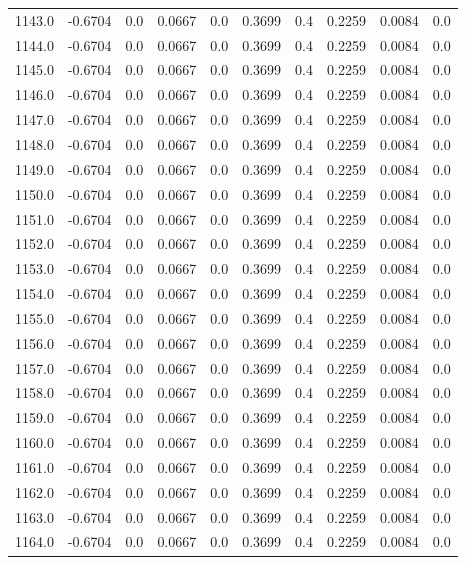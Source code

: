 \begin{longtable}{lrrrrrrrrr}
1143.0 & -0.6704 & 0.0 & 0.0667 & 0.0 & 0.3699 & 0.4 & 0.2259 & 0.0084 & 0.0 \\
1144.0 & -0.6704 & 0.0 & 0.0667 & 0.0 & 0.3699 & 0.4 & 0.2259 & 0.0084 & 0.0 \\
1145.0 & -0.6704 & 0.0 & 0.0667 & 0.0 & 0.3699 & 0.4 & 0.2259 & 0.0084 & 0.0 \\
1146.0 & -0.6704 & 0.0 & 0.0667 & 0.0 & 0.3699 & 0.4 & 0.2259 & 0.0084 & 0.0 \\
1147.0 & -0.6704 & 0.0 & 0.0667 & 0.0 & 0.3699 & 0.4 & 0.2259 & 0.0084 & 0.0 \\
1148.0 & -0.6704 & 0.0 & 0.0667 & 0.0 & 0.3699 & 0.4 & 0.2259 & 0.0084 & 0.0 \\
1149.0 & -0.6704 & 0.0 & 0.0667 & 0.0 & 0.3699 & 0.4 & 0.2259 & 0.0084 & 0.0 \\
1150.0 & -0.6704 & 0.0 & 0.0667 & 0.0 & 0.3699 & 0.4 & 0.2259 & 0.0084 & 0.0 \\
1151.0 & -0.6704 & 0.0 & 0.0667 & 0.0 & 0.3699 & 0.4 & 0.2259 & 0.0084 & 0.0 \\
1152.0 & -0.6704 & 0.0 & 0.0667 & 0.0 & 0.3699 & 0.4 & 0.2259 & 0.0084 & 0.0 \\
1153.0 & -0.6704 & 0.0 & 0.0667 & 0.0 & 0.3699 & 0.4 & 0.2259 & 0.0084 & 0.0 \\
1154.0 & -0.6704 & 0.0 & 0.0667 & 0.0 & 0.3699 & 0.4 & 0.2259 & 0.0084 & 0.0 \\
1155.0 & -0.6704 & 0.0 & 0.0667 & 0.0 & 0.3699 & 0.4 & 0.2259 & 0.0084 & 0.0 \\
1156.0 & -0.6704 & 0.0 & 0.0667 & 0.0 & 0.3699 & 0.4 & 0.2259 & 0.0084 & 0.0 \\
1157.0 & -0.6704 & 0.0 & 0.0667 & 0.0 & 0.3699 & 0.4 & 0.2259 & 0.0084 & 0.0 \\
1158.0 & -0.6704 & 0.0 & 0.0667 & 0.0 & 0.3699 & 0.4 & 0.2259 & 0.0084 & 0.0 \\
1159.0 & -0.6704 & 0.0 & 0.0667 & 0.0 & 0.3699 & 0.4 & 0.2259 & 0.0084 & 0.0 \\
1160.0 & -0.6704 & 0.0 & 0.0667 & 0.0 & 0.3699 & 0.4 & 0.2259 & 0.0084 & 0.0 \\
1161.0 & -0.6704 & 0.0 & 0.0667 & 0.0 & 0.3699 & 0.4 & 0.2259 & 0.0084 & 0.0 \\
1162.0 & -0.6704 & 0.0 & 0.0667 & 0.0 & 0.3699 & 0.4 & 0.2259 & 0.0084 & 0.0 \\
1163.0 & -0.6704 & 0.0 & 0.0667 & 0.0 & 0.3699 & 0.4 & 0.2259 & 0.0084 & 0.0 \\
1164.0 & -0.6704 & 0.0 & 0.0667 & 0.0 & 0.3699 & 0.4 & 0.2259 & 0.0084 & 0.0 \\

\end{longtable}
